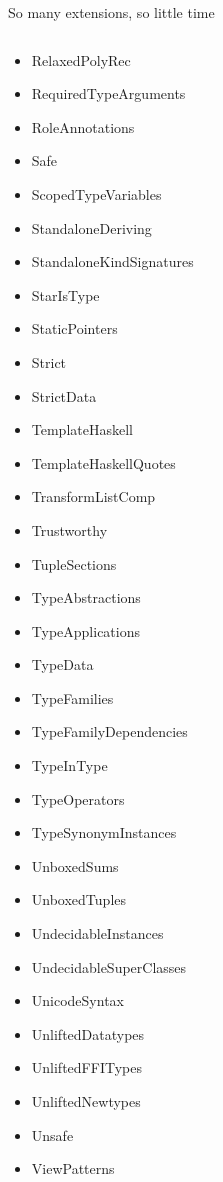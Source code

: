 \documentclass[handout]{beamer}
\begin{document}
\begin{frame}{So many extensions, so little time}
\begin{columns}[T]
\begin{column}{.33\textwidth}
\begin{itemize}
      \item RelaxedPolyRec \item RequiredTypeArguments \item RoleAnnotations \item Safe \item ScopedTypeVariables \item StandaloneDeriving \item StandaloneKindSignatures \item StarIsType \item StaticPointers \item Strict \item StrictData \item TemplateHaskell \item TemplateHaskellQuotes \item TransformListComp \item Trustworthy \item TupleSections \item TypeAbstractions \item TypeApplications \item TypeData \item TypeFamilies \item TypeFamilyDependencies \item TypeInType \item TypeOperators \item TypeSynonymInstances \item UnboxedSums \item UnboxedTuples \item UndecidableInstances \item UndecidableSuperClasses \item UnicodeSyntax \item UnliftedDatatypes \item UnliftedFFITypes \item UnliftedNewtypes \item Unsafe \item ViewPatterns
    \end{itemize}

  \end{column}

\end{columns}

\end{frame}
\end{document}
